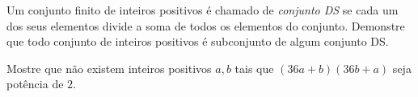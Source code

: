 \begin{questao}
  Um conjunto finito de inteiros positivos é chamado de {\it conjunto
    DS} se cada um dos seus elementos divide a soma de todos os
  elementos do conjunto. Demonstre que todo conjunto de inteiros
  positivos é subconjunto de algum conjunto DS.
\end{questao}

\begin{questao}
  Mostre que não existem inteiros positivos $a,b$ tais que
  $(36a+b)(36b+a)$ seja potência de $2$.
\end{questao}

